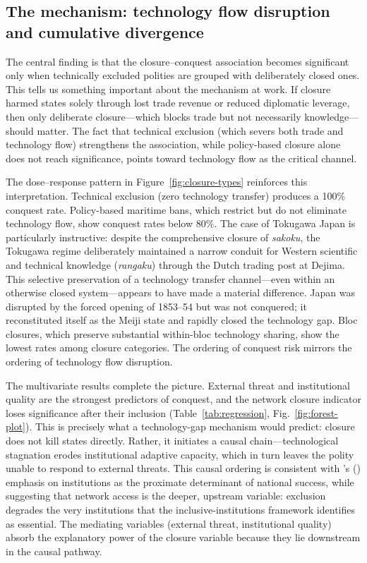 \documentclass[pdflatex,sn-basic]{sn-jnl}
\theoremstyle{thmstyleone}%
\theoremstyle{thmstyletwo}%
\theoremstyle{thmstylethree}%
\begin{document}
\subsection{The mechanism: technology flow disruption and cumulative divergence}\label{sec:disc-mechanism}

The central finding is that the closure--conquest association becomes significant only when technically excluded polities are grouped with deliberately closed ones. This tells us something important about the mechanism at work. If closure harmed states solely through lost trade revenue or reduced diplomatic leverage, then only deliberate closure---which blocks trade but not necessarily knowledge---should matter. The fact that technical exclusion (which severs both trade and technology flow) strengthens the association, while policy-based closure alone does not reach significance, points toward technology flow as the critical channel.

The dose--response pattern in Figure~\ref{fig:closure-types} reinforces this interpretation. Technical exclusion (zero technology transfer) produces a 100\% conquest rate. Policy-based maritime bans, which restrict but do not eliminate technology flow, show conquest rates below 80\%. The case of Tokugawa Japan is particularly instructive: despite the comprehensive closure of \emph{sakoku}, the Tokugawa regime deliberately maintained a narrow conduit for Western scientific and technical knowledge (\emph{rangaku}) through the Dutch trading post at Dejima. This selective preservation of a technology transfer channel---even within an otherwise closed system---appears to have made a material difference. Japan was disrupted by the forced opening of 1853--54 but was not conquered; it reconstituted itself as the Meiji state and rapidly closed the technology gap. Bloc closures, which preserve substantial within-bloc technology sharing, show the lowest rates among closure categories. The ordering of conquest risk mirrors the ordering of technology flow disruption.

The multivariate results complete the picture. External threat and institutional quality are the strongest predictors of conquest, and the network closure indicator loses significance after their inclusion (Table~\ref{tab:regression}, Fig.~\ref{fig:forest-plot}). This is precisely what a technology-gap mechanism would predict: closure does not kill states directly. Rather, it initiates a causal chain---technological stagnation erodes institutional adaptive capacity, which in turn leaves the polity unable to respond to external threats. This causal ordering is consistent with \citeauthor{AcemogluRobinson2012}'s (\citeyear{AcemogluRobinson2012}) emphasis on institutions as the proximate determinant of national success, while suggesting that network access is the deeper, upstream variable: exclusion degrades the very institutions that the inclusive-institutions framework identifies as essential. The mediating variables (external threat, institutional quality) absorb the explanatory power of the closure variable because they lie downstream in the causal pathway.
\end{document}
